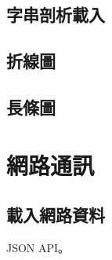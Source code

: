 \documentclass[a4paper,12pt]{book}
\begin{document}
\chapter{字串剖析載入}

\chapter{折線圖}

\chapter{長條圖}

\part{網路通訊}

\chapter{載入網路資料}

JSON API。

\backmatter
\end{document}
